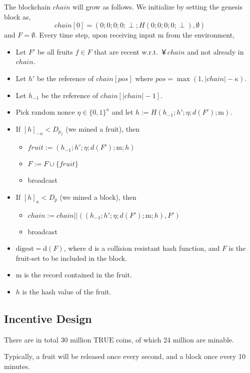 The blockchain $chain$ will grow as follows. We initialize by setting the genesis block as,
$$
chain[0] = (0;0;0;0;\perp ;H(0;0;0;0;\perp ),\emptyset )
$$
and $F = \emptyset$. Every time step, upon receiving input $\mathrm{m}$ from the environment, 
\begin{itemize}
	\item Let $F'$ be all fruits $f \in F$ that are recent w.r.t. ￥$chain$ and not already in $chain$.
	
	\item Let $h'$ be the reference of $chain[pos]$ where $pos = \max ( 1, |chain| - \kappa ) $. 
	
	\item Let $h_{-1}$ be the reference of $chain[|chain| - 1]$. 
	
	\item Pick random nonce $\eta \in \{ 0,1 \}^\kappa$ and let $h:=H(h_{-1}; h';\eta ; d(F'); \mathrm{m})$. 
	
	\item If $[h]_{-\kappa} < D_{p_f}$ (we mined a fruit), then 
	\begin{itemize}
	\item $fruit:=(h_{-1}; h';\eta ; d(F'); \mathrm{m};h)$
	
	\item $F := F \cup \{ fruit \}$
	
	\item broadcast
	\end{itemize}

	\item If $[h]_{\kappa} < D_{p}$ (we mined a block), then 
\begin{itemize}	
	\item $chain := chain || ((h_{-1}; h';\eta ; d(F'); \mathrm{m}; h), F')$
	
	\item broadcast
\end{itemize}

	\item $\mathrm{digest} = \mathrm{d}(F)$, where $\mathrm{d}$ is a collision resistant hash function, and $F$ is the fruit-set to be included in the block. 
	
	\item $\mathrm{m}$ is the record contained in the fruit.
	
	\item $h$ is the hash value of the fruit.	
\end{itemize}

\subsection{Incentive Design}

There are in total 30 million $\mathrm{TRUE}$ coins, of which 24 million are minable.

Typically, a fruit will be released once every second, and a block once every 10 minutes. 

